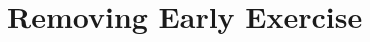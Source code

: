 %
\renewcommand{\figdir}{figures/ch07}
\chapter[Removing early exercise]{Removing Early Exercise}
\label{ch:deam}

